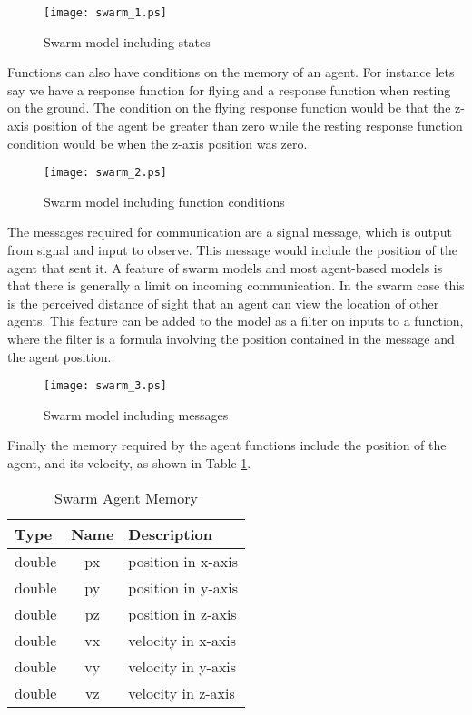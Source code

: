 \begin{figure}[h]
\begin{center}
\texttt{[image: swarm\_1.ps]}
\caption{Swarm model including states}
\label{fig:swarm_1}
\end{center}
\end{figure}

Functions can also have conditions on the memory of an agent. For instance lets
say we have a response function for flying and a response function when resting
on the ground. The condition on the flying response function would be that the
z-axis position of the agent be greater than zero while the resting response
function condition would be when the z-axis position was zero.

\begin{figure}[h]
\begin{center}
\texttt{[image: swarm\_2.ps]}
\caption{Swarm model including function conditions}
\label{fig:swarm_2}
\end{center}
\end{figure}

The messages required for communication are a signal message, which is output
from signal and input to observe. This message would include the position of the
agent that sent it. A feature of swarm models and most agent-based models is that
there is generally a limit on incoming communication. In the swarm case this is
the perceived distance of sight that an agent can view the location of other
agents. This feature can be added to the model as a filter on inputs to a
function, where the filter is a formula involving the position contained in the
message and the agent position.

\begin{figure}[h]
\begin{center}
\texttt{[image: swarm\_3.ps]}
\caption{Swarm model including messages}
\label{fig:swarm_3}
\end{center}
\end{figure}

Finally the memory required by the agent functions include the position of the
agent, and its velocity, as shown in Table \ref{tab:swarm_memory}.

\begin{table}[h]
\centering
\begin{tabular}{|l||c||l|}
\hline
Type&Name&Description\\
\hline \hline
double&px&position in x-axis\\
\hline
double&py&position in y-axis\\
\hline
double&pz&position in z-axis\\
\hline
double&vx&velocity in x-axis\\
\hline
double&vy&velocity in y-axis\\
\hline
double&vz&velocity in z-axis\\
\hline
\end{tabular}
\caption{Swarm Agent Memory}
\label{tab:swarm_memory}
\end{table}

